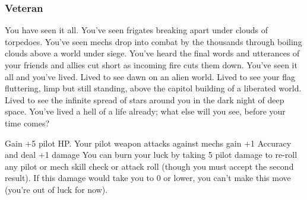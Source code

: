\subsubsection{Veteran}

\begin{talent}
{You have seen it all. You've seen frigates breaking apart under clouds of torpedoes. You've seen mechs drop into combat by the thousands through boiling clouds above a world under siege. You've heard the final words and utterances of your friends and allies cut short as incoming fire cuts them down. You've seen it all and you've lived. Lived to see dawn on an alien world. Lived to see your flag fluttering, limp but still standing, above the capitol building of a liberated world. Lived to see the infinite spread of stars around you in the dark night of deep space. You've lived a hell of a life already; what else will you see, before your time comes?}

Gain +5 pilot HP. 
Your pilot weapon attacks against mechs gain +1 Accuracy and deal +1 damage 
You can burn your luck by taking 5 pilot damage to re-roll any pilot or mech skill check or attack roll (though you must accept the second result). If this damage would take you to 0 or lower, you can't make this move (you're out of luck for now).
\end{talent}